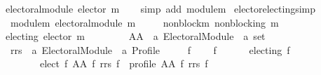 \begin{isabellebody}
\ \ \ {\isachardoublequoteopen}electoral{\isacharunderscore}{\kern0pt}module\ {\isacharparenleft}{\kern0pt}elector\ m{\isacharparenright}{\kern0pt}{\isachardoublequoteclose}\isanewline
%
\isadelimproof
\ \ %
\endisadelimproof
%
\isatagproof
{}\isamarkupfalse%
\ {\isacharparenleft}{\kern0pt}simp\ add{\isacharcolon}{\kern0pt}\ module{\isacharunderscore}{\kern0pt}m{\isacharparenright}{\kern0pt}%
\endisatagproof
{\isafoldproof}%
%
\isadelimproof
%
\endisadelimproof
%
\isadelimdocument
%
\endisadelimdocument
%
\isatagdocument
%
\isamarkuptrue%
%
\endisatagdocument
{\isafolddocument}%
%
\isadelimdocument
%
\endisadelimdocument
{}\isamarkupfalse%
\ elector{\isacharunderscore}{\kern0pt}electing{\isacharbrackleft}{\kern0pt}simp{\isacharbrackright}{\kern0pt}{\isacharcolon}{\kern0pt}\isanewline
\ \ \isanewline
\ \ \ \ module{\isacharunderscore}{\kern0pt}m{\isacharcolon}{\kern0pt}\ {\isachardoublequoteopen}electoral{\isacharunderscore}{\kern0pt}module\ m{\isachardoublequoteclose}\ \isanewline
\ \ \ \ non{\isacharunderscore}{\kern0pt}block{\isacharunderscore}{\kern0pt}m{\isacharcolon}{\kern0pt}\ {\isachardoublequoteopen}non{\isacharunderscore}{\kern0pt}blocking\ m{\isachardoublequoteclose}\isanewline
\ \ \ {\isachardoublequoteopen}electing\ {\isacharparenleft}{\kern0pt}elector\ m{\isacharparenright}{\kern0pt}{\isachardoublequoteclose}\isanewline
%
\isadelimproof
%
\endisadelimproof
%
\isatagproof
{}\isamarkupfalse%
\ {\isacharminus}{\kern0pt}\isanewline
\ \ \isamarkupfalse%
\isanewline
\ \ \ \ AA\ {\isacharcolon}{\kern0pt}{\isacharcolon}{\kern0pt}\ {\isachardoublequoteopen}{\isacharprime}{\kern0pt}a\ Electoral{\isacharunderscore}{\kern0pt}Module\ {\isasymRightarrow}\ {\isacharprime}{\kern0pt}a\ set{\isachardoublequoteclose}\ \isanewline
\ \ \ \ rrs\ {\isacharcolon}{\kern0pt}{\isacharcolon}{\kern0pt}\ {\isachardoublequoteopen}{\isacharprime}{\kern0pt}a\ Electoral{\isacharunderscore}{\kern0pt}Module\ {\isasymRightarrow}\ {\isacharprime}{\kern0pt}a\ Profile{\isachardoublequoteclose}\ \isanewline
\ \ \ \ f{}{\isacharcolon}{\kern0pt}\isanewline
\ \ \ \ {\isachardoublequoteopen}{\isasymforall}f{\isachardot}{\kern0pt}\isanewline
\ \ \ \ \ \ {\isacharparenleft}{\kern0pt}electing\ f\ {\isasymor}\isanewline
\ \ \ \ \ \ \ \ {\isacharbraceleft}{\kern0pt}{\isacharbraceright}{\kern0pt}\ {\isacharequal}{\kern0pt}\ elect\ f\ {\isacharparenleft}{\kern0pt}AA\ f{\isacharparenright}{\kern0pt}\ {\isacharparenleft}{\kern0pt}rrs\ f{\isacharparenright}{\kern0pt}\ {\isasymand}\ profile\ {\isacharparenleft}{\kern0pt}AA\ f{\isacharparenright}{\kern0pt}\ {\isacharparenleft}{\kern0pt}rrs\ f{\isacharparenright}{\kern0pt}\ {\isasymand}\isanewline

\end{isabellebody}
